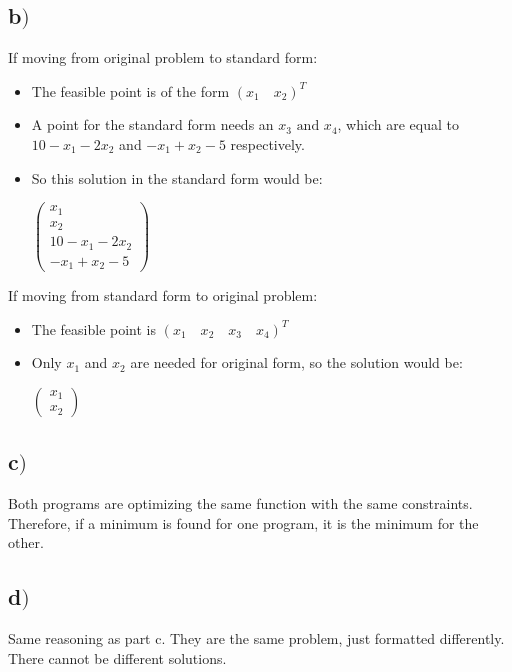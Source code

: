 \documentclass[a4paper,12pt]{article}
\begin{document}
\subsection*{b\()\)}
If moving from original problem to standard form: \\
\begin{itemize}
  \item The feasible point is of the form \( (x_1 \quad x_2)^T \)
  \item A point for the standard form needs an \( x_3 \text{ and } x_4 \), which
    are equal to \(10 - x_1 - 2x_2\) and \(-x_1 + x_2 - 5\) respectively.
  \item So this solution in the standard form would be: \\
    \begin{center}
      \(\left(
      \begin{array}{c}
	x_1\\ x_2\\ 10 - x_1 - 2x_2\\ -x_1 + x_2 - 5
      \end{array}
      \right)\)
    \end{center}
\end{itemize}
If moving from standard form to original problem:
\begin{itemize}
  \item The feasible point is \( (x_1 \quad x_2 \quad x_3 \quad x_4)^T \)
  \item Only \(x_1\) and \(x_2\) are needed for original form, so the solution would be: \\
    \begin{center}
      \(\left(
      \begin{array}{c}
        x_1 \\ x_2
      \end{array}
      \right)\)
    \end{center}
\end{itemize}
\subsection*{c\()\)}
Both programs are optimizing the same function with the same constraints. Therefore, if a minimum is
found for one program, it is the minimum for the other.
\subsection*{d\()\)}
Same reasoning as part c. They are the same problem, just formatted differently. There cannot be different
solutions.
\end{document}

